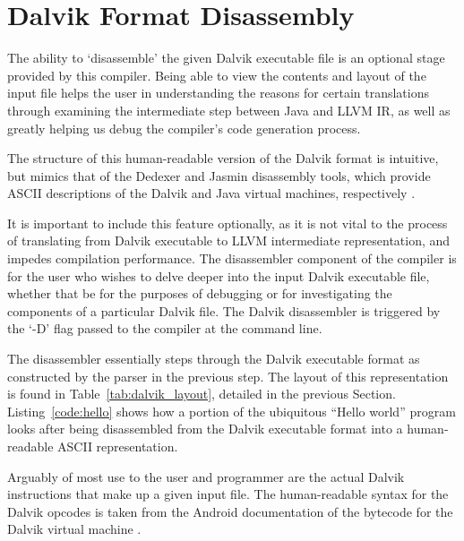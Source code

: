 \section{Dalvik Format Disassembly}
\label{sec:diss}

The ability to `disassemble' the given Dalvik executable file is an optional stage provided by this compiler. Being able to view the contents and layout of the input file helps the user in understanding the reasons for certain translations through examining the intermediate step between Java and LLVM IR, as well as greatly helping us debug the compiler's code generation process.

The structure of this human-readable version of the Dalvik format is intuitive, but mimics that of the Dedexer and Jasmin disassembly tools, which provide ASCII descriptions of the Dalvik and Java virtual machines, respectively\footnotemark {} \footnotemark {}. 

It is important to include this feature optionally, as it is not vital to the process of translating from Dalvik executable to LLVM intermediate representation, and impedes compilation performance. The disassembler component of the compiler is for the user who wishes to delve deeper into the input Dalvik executable file, whether that be for the purposes of debugging or for investigating the components of a particular Dalvik file. The Dalvik disassembler is triggered by the `-D' flag passed to the compiler at the command line.

The disassembler essentially steps through the Dalvik executable format as constructed by the parser in the previous step. The layout of this representation is found in Table~\ref{tab:dalvik_layout}, detailed in the previous Section. Listing~\ref{code:hello} shows how a portion of the ubiquitous ``Hello world'' program looks after being disassembled from the Dalvik executable format into a human-readable ASCII representation.

Arguably of most use to the user and programmer are the actual Dalvik instructions that make up a given input file. The human-readable syntax for the Dalvik opcodes is taken from the Android documentation of the bytecode for the Dalvik virtual machine \cite{dvk_bytecode} \cite{dvk_opcodes}.

\newpage

\lstset{
	language=Assembler,
	basicstyle=\small,
	stringstyle=\ttfamily
}

